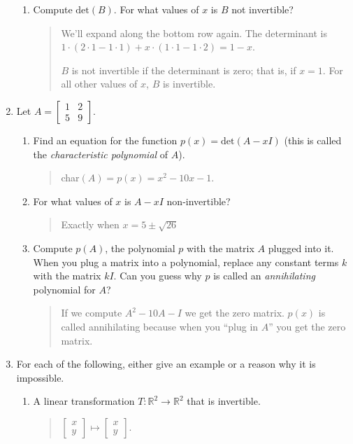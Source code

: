 \documentclass[letter]{article}
\newcommand{\R}{\mathbb{R}}
\newcommand{\Det}{\mathrm{det}}
\newcommand{\mat}[1]{\begin{bmatrix}#1\end{bmatrix}}
\begin{document}
\begin{enumerate}
\begin{enumerate}
			\item Compute $\Det(B)$.  For what values of $x$ is $B$ not invertible?
				\begin{quote}
					We'll expand along the bottom row again.  The determinant is $1 \cdot (2 \cdot 1 - 1 \cdot 1) + x \cdot (1 \cdot 1 - 1 \cdot 2) = 1 - x$.
					
					$B$ is not invertible if the determinant is zero; that is, if $x=1$.  For all other values of $x$, $B$ is invertible.
				\end{quote}

		\end{enumerate}

		\item Let $A=\mat{1&2\\5&9}$.
		\begin{enumerate}
			\item Find an equation for the function $p(x)=\Det(A-xI)$ (this is called the
				\emph{characteristic polynomial} of $A$).
				\begin{quote}
					char$(A)=p(x)=x^2-10x-1$.
				\end{quote}

			\item For what values of $x$ is $A-xI$ non-invertible?
				\begin{quote}
					Exactly when $x=5\pm\sqrt{26}$
				\end{quote}

			\item Compute $p(A)$, the polynomial $p$ with the matrix $A$ plugged into it.  When you plug a matrix
				into a polynomial, replace any constant terms $k$ with the matrix $kI$.
				Can you guess
				why $p$ is called an \emph{annihilating} polynomial for $A$?
				\begin{quote}
					If we compute $A^2-10A-I$ we get the zero matrix.  $p(x)$ is called annihilating
					because when you ``plug in $A$'' you get the zero matrix.
				\end{quote}

		\end{enumerate}

		\item For each of the following, either give an example or a reason why it is impossible.
		\begin{enumerate}
			\item A linear transformation $T:\R^2\to\R^2$ that is invertible.
			\begin{quote}
				$\mat{x\\y}\mapsto\mat{x\\y}$.
			\end{quote}


\end{enumerate}
\end{enumerate}
\end{document}
